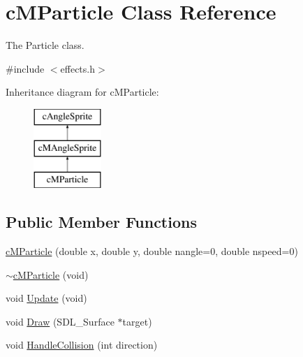 \hypertarget{classc_m_particle}{\section{c\-M\-Particle Class Reference}
\label{classc_m_particle}
}


The Particle class.  




{\ttfamily \#include $<$effects.\-h$>$}

Inheritance diagram for c\-M\-Particle\-:\begin{figure}[H]
\begin{center}
\leavevmode
\includegraphics[height=3.000000cm]{classc_m_particle}
\end{center}
\end{figure}
\subsection*{Public Member Functions}
\begin{DoxyCompactItemize}
\item 
\hyperlink{classc_m_particle_a4146359078952df6f3254ca721143401}{c\-M\-Particle} (double x, double y, double nangle=0, double nspeed=0)
\item 
\hyperlink{classc_m_particle_a841f87e4bcdd4688429c836767c76837}{$\sim$c\-M\-Particle} (void)
\item 
void \hyperlink{classc_m_particle_a51a5aef9295c60549d64fdf87aa06524}{Update} (void)
\item 
void \hyperlink{classc_m_particle_a4c759a149bb5fe20c002ac9fb7806226}{Draw} (S\-D\-L\-\_\-\-Surface $\ast$target)
\item 
void \hyperlink{classc_m_particle_a3b2f0d5efe396abb2d2c299883ae1c2b}{Handle\-Collision} (int direction)
\end{DoxyCompactItemize}

